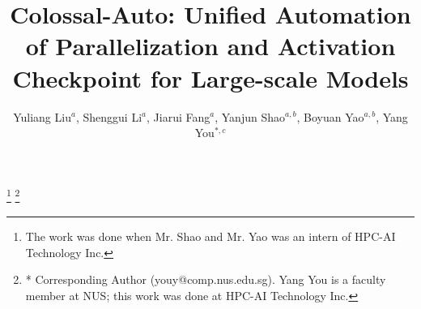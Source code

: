 \documentclass[sigplan,screen,nonacm]{acmart}
\begin{document}

\title{Colossal-Auto: Unified Automation of Parallelization and Activation Checkpoint for Large-scale Models }

\author{Yuliang Liu$^{a}$, Shenggui Li$^{a}$, Jiarui Fang$^{a}$, Yanjun Shao$^{a, b}$, Boyuan Yao$^{a, b}$, Yang You$^{*, c}$}

\thanks{The work was done when Mr. Shao and Mr. Yao was an intern of HPC-AI Technology Inc.}
\thanks{* Corresponding Author (youy@comp.nus.edu.sg). Yang You is a faculty member at NUS; this work was done at HPC-AI Technology Inc.}






\end{document}
